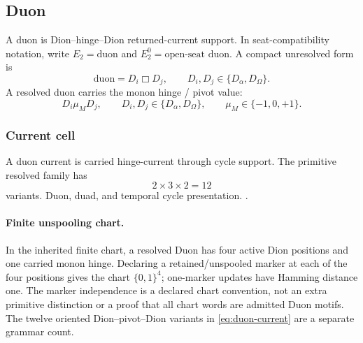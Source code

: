 \subsection{Duon}\label{subsec:duon}
\begin{definition}
A duon is Dion--hinge--Dion returned-current support. In seat-compatibility notation, write \(E_2=\mathrm{duon}\) and \(E_2^0=\text{open-seat duon}\). A compact unresolved form is
\[
\mathrm{duon}=D_i\Box D_j,
\qquad D_i,D_j\in\{D_\alpha,D_\Omega\}.
\]
A resolved duon carries the monon hinge / pivot value:
\begin{equation}
D_i\mu_M D_j,
\qquad
D_i,D_j\in\{D_\alpha,D_\Omega\},
\qquad
\mu_M\in\{-1,0,+1\}.
\label{eq:duon-current}
\end{equation}
\end{definition}

\subsubsection{Current cell}\label{subsec:duon-current-cell}
A duon current is carried hinge-current through cycle support. The primitive resolved family has
\[
2\times3\times2=12
\]
variants. Duon, duad, and temporal cycle presentation. .

\paragraph{Finite unspooling chart.}
\label{subsec:finite-q4-witness}
In the inherited finite chart, a resolved Duon has four active Dion positions
and one carried monon hinge. Declaring a retained/unspooled marker at each of
the four positions gives the chart \(\{0,1\}^4\); one-marker updates have
Hamming distance one. The marker independence is a declared chart convention,
not an extra primitive distinction or a proof that all chart words are admitted
Duon motifs. The twelve oriented Dion--pivot--Dion variants in
\eqref{eq:duon-current} are a separate grammar count.

